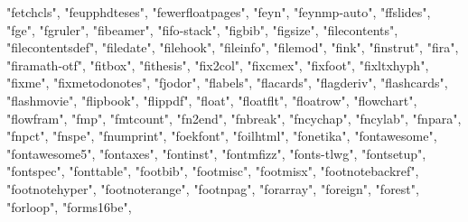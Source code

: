 \documentclass[
]{article}
\newenvironment{Shaded}{\begin{snugshade}}{\end{snugshade}}
\newcommand{\NormalTok}[1]{#1}
\newcommand{\StringTok}[1]{\textcolor[rgb]{0.31,0.60,0.02}{#1}}
\begin{document}
\begin{Shaded}
\begin{Highlighting}[]
\StringTok{"fetchcls"}\NormalTok{, }\StringTok{"feupphdteses"}\NormalTok{, }\StringTok{"fewerfloatpages"}\NormalTok{, }\StringTok{"feyn"}\NormalTok{, }\StringTok{"feynmp{-}auto"}\NormalTok{, }
\StringTok{"ffslides"}\NormalTok{, }\StringTok{"fge"}\NormalTok{, }\StringTok{"fgruler"}\NormalTok{, }\StringTok{"fibeamer"}\NormalTok{, }\StringTok{"fifo{-}stack"}\NormalTok{, }\StringTok{"figbib"}\NormalTok{, }
\StringTok{"figsize"}\NormalTok{, }\StringTok{"filecontents"}\NormalTok{, }\StringTok{"filecontentsdef"}\NormalTok{, }\StringTok{"filedate"}\NormalTok{, }\StringTok{"filehook"}\NormalTok{, }
\StringTok{"fileinfo"}\NormalTok{, }\StringTok{"filemod"}\NormalTok{, }\StringTok{"fink"}\NormalTok{, }\StringTok{"finstrut"}\NormalTok{, }\StringTok{"fira"}\NormalTok{, }\StringTok{"firamath{-}otf"}\NormalTok{, }
\StringTok{"fitbox"}\NormalTok{, }\StringTok{"fithesis"}\NormalTok{, }\StringTok{"fix2col"}\NormalTok{, }\StringTok{"fixcmex"}\NormalTok{, }\StringTok{"fixfoot"}\NormalTok{, }\StringTok{"fixltxhyph"}\NormalTok{, }
\StringTok{"fixme"}\NormalTok{, }\StringTok{"fixmetodonotes"}\NormalTok{, }\StringTok{"fjodor"}\NormalTok{, }\StringTok{"flabels"}\NormalTok{, }\StringTok{"flacards"}\NormalTok{, }\StringTok{"flagderiv"}\NormalTok{, }
\StringTok{"flashcards"}\NormalTok{, }\StringTok{"flashmovie"}\NormalTok{, }\StringTok{"flipbook"}\NormalTok{, }\StringTok{"flippdf"}\NormalTok{, }\StringTok{"float"}\NormalTok{, }\StringTok{"floatflt"}\NormalTok{, }
\StringTok{"floatrow"}\NormalTok{, }\StringTok{"flowchart"}\NormalTok{, }\StringTok{"flowfram"}\NormalTok{, }\StringTok{"fmp"}\NormalTok{, }\StringTok{"fmtcount"}\NormalTok{, }\StringTok{"fn2end"}\NormalTok{, }
\StringTok{"fnbreak"}\NormalTok{, }\StringTok{"fncychap"}\NormalTok{, }\StringTok{"fncylab"}\NormalTok{, }\StringTok{"fnpara"}\NormalTok{, }\StringTok{"fnpct"}\NormalTok{, }\StringTok{"fnspe"}\NormalTok{, }
\StringTok{"fnumprint"}\NormalTok{, }\StringTok{"foekfont"}\NormalTok{, }\StringTok{"foilhtml"}\NormalTok{, }\StringTok{"fonetika"}\NormalTok{, }\StringTok{"fontawesome"}\NormalTok{, }
\StringTok{"fontawesome5"}\NormalTok{, }\StringTok{"fontaxes"}\NormalTok{, }\StringTok{"fontinst"}\NormalTok{, }\StringTok{"fontmfizz"}\NormalTok{, }\StringTok{"fonts{-}tlwg"}\NormalTok{, }
\StringTok{"fontsetup"}\NormalTok{, }\StringTok{"fontspec"}\NormalTok{, }\StringTok{"fonttable"}\NormalTok{, }\StringTok{"footbib"}\NormalTok{, }\StringTok{"footmisc"}\NormalTok{, }
\StringTok{"footmisx"}\NormalTok{, }\StringTok{"footnotebackref"}\NormalTok{, }\StringTok{"footnotehyper"}\NormalTok{, }\StringTok{"footnoterange"}\NormalTok{, }
\StringTok{"footnpag"}\NormalTok{, }\StringTok{"forarray"}\NormalTok{, }\StringTok{"foreign"}\NormalTok{, }\StringTok{"forest"}\NormalTok{, }\StringTok{"forloop"}\NormalTok{, }\StringTok{"forms16be"}\NormalTok{, }

\end{Highlighting}
\end{Shaded}
\end{document}
